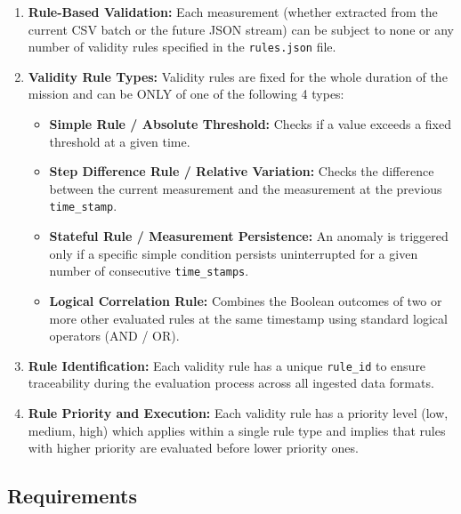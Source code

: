 \documentclass[11pt, a4paper]{article}
\begin{document}
\begin{enumerate}[label=\textbf{DA-\arabic*:}, align=left, leftmargin=2cm]
    \item \textbf{Rule-Based Validation:} Each measurement (whether extracted from the current CSV batch or the future JSON stream) can be subject to none or any number of validity rules specified in the \texttt{rules.json} file.

    \item \textbf{Validity Rule Types:} Validity rules are fixed for the whole duration of the mission and can be ONLY of one of the following 4 types:
    \begin{itemize}[leftmargin=0.5cm]
        \item \textbf{Simple Rule / Absolute Threshold:} Checks if a value exceeds a fixed threshold at a given time.
        \item \textbf{Step Difference Rule / Relative Variation:} Checks the difference between the current measurement and the measurement at the previous \texttt{time\_stamp}.
        \item \textbf{Stateful Rule / Measurement Persistence:} An anomaly is triggered only if a specific simple condition persists uninterrupted for a given number of consecutive \texttt{time\_stamps}.
        \item \textbf{Logical Correlation Rule:} Combines the Boolean outcomes of two or more other evaluated rules at the same timestamp using standard logical operators (AND / OR).
    \end{itemize}

    \item \textbf{Rule Identification:} Each validity rule has a unique \texttt{rule\_id} to ensure traceability during the evaluation process across all ingested data formats.

    \item \textbf{Rule Priority and Execution:} Each validity rule has a priority level (low, medium, high) which applies within a single rule type and implies that rules with higher priority are evaluated before lower priority ones.
\end{enumerate}

\subsection{Requirements}
\end{document}
